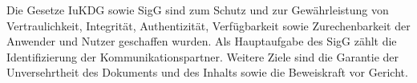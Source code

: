 Die Gesetze IuKDG sowie SigG sind zum Schutz und zur Gewährleistung von Vertraulichkeit, Integrität, Authentizität, Verfügbarkeit sowie Zurechenbarkeit der Anwender und Nutzer geschaffen wurden. \cite{standdeswissens1} Als Hauptaufgabe des SigG zählt die Identifizierung der Kommunikationspartner. Weitere Ziele sind die Garantie der Unversehrtheit des Dokuments und des Inhalts sowie die Beweiskraft vor Gericht. \cite{standdeswissens2}
